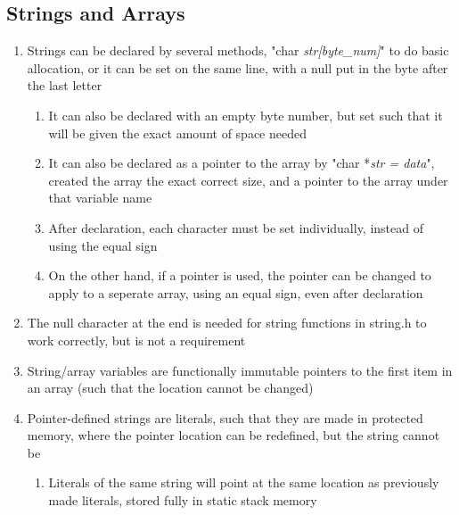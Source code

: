 \documentclass[11 pt, twoside]{article}
\begin{document}
\subsection{Strings and Arrays}
\begin{enumerate}
\item Strings can be declared by several methods, "char \textit{str[byte\_num]}" to do basic allocation, or it can be set on the same line, with a null put in the byte after the last letter
\begin{enumerate}
\item It can also be declared with an empty byte number, but set such that it will be given the exact amount of space needed
\item It can also be declared as a pointer to the array by "char *\textit{str = data}", created the array the exact correct size, and a pointer to the array under that variable name
\item After declaration, each character must be set individually, instead of using the equal sign
\item On the other hand, if a pointer is used, the pointer can be changed to apply to a seperate array, using an equal sign, even after declaration
\end{enumerate}
\item The null character at the end is needed for string functions in string.h to work correctly, but is not a requirement
\item String/array variables are functionally immutable pointers to the first item in an array (such that the location cannot be changed)
\item Pointer-defined strings are literals, such that they are made in protected memory, where the pointer location can be redefined, but the string cannot be
\begin{enumerate}
\item Literals of the same string will point at the same location as previously made literals, stored fully in static stack memory
\end{enumerate}
\end{enumerate}
\end{document}
